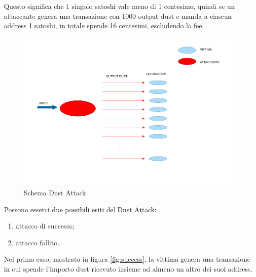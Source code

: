 Questo significa che 1 singolo satoshi vale meno di 1 centesimo, quindi se un attaccante genera una transazione con 1000 output dust e manda a ciascun address 1 satoshi, in totale spende 16 centesimi, escludendo la fee.   
\begin{figure}[h!]
    \centering
    \includegraphics[scale=0.5, trim = 1cm 5cm 0cm 0cm, clip]{Images/dust_attack.pdf}
    \caption{Schema Dust Attack}
    \label{fig:Dust_attack}
\end{figure}
\FloatBarrier
Possono esserci due possibili esiti del Dust Attack: 
    \begin{enumerate}
        \item attacco di successo;
        \item attacco fallito.
    \end{enumerate}
    
Nel primo caso, mostrato in figura \ref{fig:success}, la vittima genera una transazione in cui spende l'importo dust ricevuto insieme ad almeno un altro dei suoi address. 

